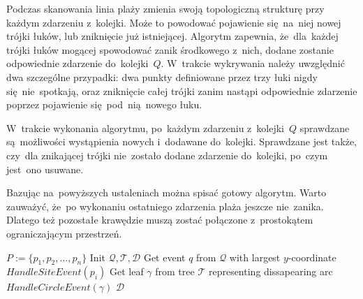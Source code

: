 \documentclass[skorowidz,autorrok,backref,xodstep,oswiadczenie]{wmimgr}
\begin{document}
Podczas skanowania linia plaży zmienia swoją topologiczną strukturę przy każdym zdarzeniu z~kolejki. Może to powodować pojawienie się~na~niej nowej trójki łuków, lub zniknięcie już istniejącej. Algorytm zapewnia, że~dla~każdej trójki łuków mogącej spowodować zanik środkowego z~nich, dodane zostanie odpowiednie zdarzenie do~kolejki~$Q$. W~trakcie wykrywania należy uwzględnić dwa szczególne przypadki: dwa punkty definiowane przez trzy łuki nigdy się~nie~spotkają, oraz zniknięcie całej trójki zanim nastąpi odpowiednie zdarzenie poprzez pojawienie się~pod~nią~nowego łuku.

W~trakcie wykonania algorytmu, po~każdym zdarzeniu z~kolejki~$Q$ sprawdzane są~możliwości wystąpienia nowych i~dodawane do~kolejki. Sprawdzane jest także, czy~dla znikającej trójki nie~zostało dodane zdarzenie do~kolejki, po~czym jest~ono usuwane.

Bazując na~powyższych ustaleniach można spisać gotowy algorytm. Warto zauważyć, że~po wykonaniu ostatniego zdarzenia plaża jeszcze nie~zanika. Dlatego też pozostałe krawędzie muszą zostać połączone z~prostokątem ograniczającym przestrzeń.

\begin{algorithm}
\caption{$VoronoiDiagram(P)$ \cite{geometria}}
\label{fortune}  %
\begin{algorithmic}
    \REQUIRE $P := \{p_{1}, p_{2}, ... , p_{n}\}$
    \STATE Init $\mathcal{Q, T, D}$
        \STATE Get event $q$ from $\mathcal{Q}$ with largest $y$-coordinate
            \STATE $HandleSiteEvent(p_{i})$
        \ELSE
            \STATE Get leaf $\gamma$ from tree $\mathcal{T}$ representing dissapearing arc
            \STATE $HandleCircleEvent(\gamma)$
        \ENDIF
    \ENDWHILE
    \RETURN $\mathcal{D}$
\end{algorithmic}
\end{algorithm}
\end{document}
